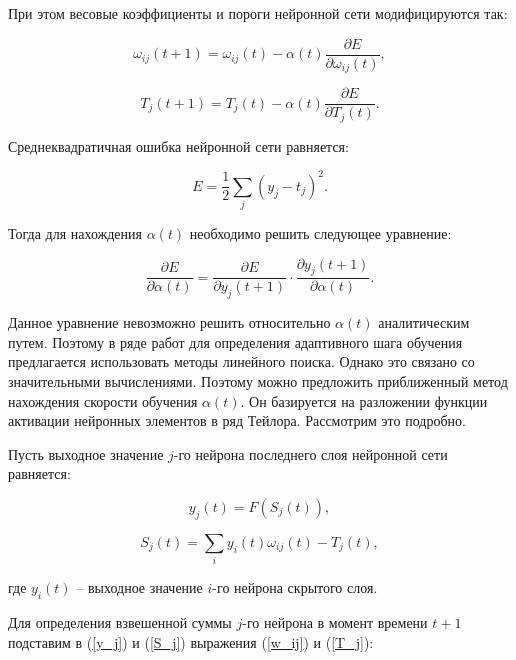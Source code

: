 При этом весовые коэффициенты и пороги нейронной сети модифицируются так:

\begin{equation}\label{w_ij}
    \omega_{i j}(t + 1) = \omega_{i j}(t) - \alpha(t)\frac{\partial E}{\partial\omega_{i j}(t)},
\end{equation}

\begin{equation}\label{T_j}
    T_j(t + 1) = T_j(t) - \alpha(t)\frac{\partial E}{\partial T_j(t)}.
\end{equation}

Среднеквадратичная ошибка нейронной сети равняется:

\begin{equation}
    E = \frac{1}{2}\sum_{j}{(y_j - t_j)^2.}
\end{equation}

Тогда для нахождения $\alpha(t)$ необходимо решить следующее уравнение:

\begin{equation}
    \frac{\partial E}{\partial\alpha(t)} = \frac{\partial E}{\partial y_j(t + 1)}\cdot\frac{\partial y_j(t + 1)}{\partial\alpha(t)}.
\end{equation}

Данное уравнение невозможно решить относительно $\alpha(t)$ аналитическим путем. Поэтому в ряде работ для определения адаптивного шага обучения предлагается использовать методы линейного поиска. Однако это связано со значительными вычислениями. Поэтому можно предложить приближенный метод нахождения скорости обучения $\alpha(t)$. Он базируется на разложении функции активации нейронных элементов в ряд Тейлора. Рассмотрим это подробно.

Пусть выходное значение $j$-го нейрона последнего слоя нейронной сети равняется:

\begin{equation}\label{y_j}
    y_j(t) = F(S_j(t)),
\end{equation}

\begin{equation}\label{S_j}
    S_j(t) = \sum_{i}{y_i(t)\omega_{i j}(t) - T_j}(t),
\end{equation}

где $y_i(t)$ – выходное значение $i$-го нейрона скрытого слоя.

Для определения взвешенной суммы $j$-го нейрона в момент времени $t + 1$ подставим в (\ref{y_j}) и (\ref{S_j}) выражения (\ref{w_ij}) и (\ref{T_j}):

